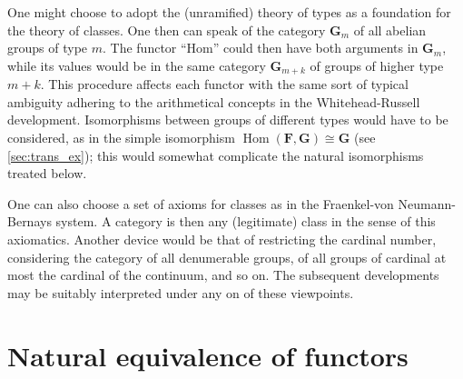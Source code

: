 \documentclass[11pt,a4paper]{report}
\DeclareMathOperator{\hm}{Hom}
\begin{document}
One might choose to adopt the (unramified) theory of types as a foundation for the theory of classes.
One then can speak of the category $\mathbf{G}_m$ of all abelian groups of type $m$. The functor ``Hom''
could then have both arguments in $\mathbf{G}_m$, while its values would be in the same category
$\mathbf{G}_{m+k}$ of groups of higher type $m+k$. This procedure affects each functor with the same
sort of typical ambiguity adhering to the arithmetical concepts in the Whitehead-Russell development.
Isomorphisms between groups of different types would have to be considered, as in the simple isomorphism
$\hm(\mathbf{F,G})\cong\mathbf{G}$ (see \cref{sec:trans_ex}); this would somewhat complicate the 
natural isomorphisms treated below.

One can also choose a set of axioms for classes as in the Fraenkel\hyp{}von Neumann\hyp{}Bernays system.
A category is then any (legitimate) class in the sense of this axiomatics. Another device would be that
of restricting the cardinal number, considering the category of all denumerable groups, of all groups of
cardinal at most the cardinal of the continuum, and so on. The subsequent developments may be suitably
interpreted under any on of these viewpoints.

\chapter{Natural equivalence of functors}\label{ch:nat_equ}
\end{document}
